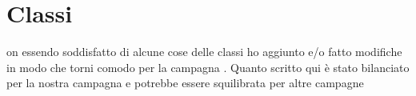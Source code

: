 \chapter{Classi}
on essendo soddisfatto di alcune cose delle classi ho aggiunto e/o fatto modifiche in modo che torni comodo per la campagna \nomecampagna.
Quanto scritto qui è stato bilanciato per la nostra campagna e potrebbe essere squilibrata per altre campagne



